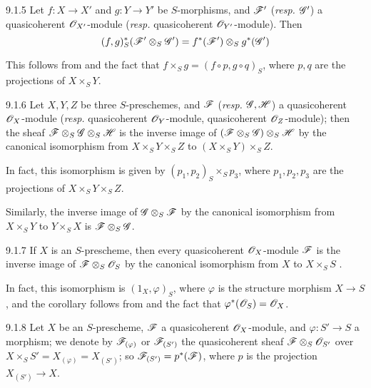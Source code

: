 \documentclass{book}
\begin{document}
\begin{envs}[Corollary]{9.1.5}
\label{cor-1.9.1.5}
Let $f\colon X\to X'$ and $g\colon Y\to Y'$ be
$S$-morphisms, and $\mathscr{F}'$ (\emph{resp.} $\mathscr{G}'$) a quasicoherent
$\mathscr{O}_{X'}$-module (\emph{resp.} quasicoherent $\mathscr{O}_{Y'}$-module). Then
\[
  (f,g)^\ast_S(\mathscr{F}'\otimes_S\mathscr{G}')
  =f^\ast(\mathscr{F}')\otimes_S g^\ast(\mathscr{G}')
\]
\end{envs}

This follows from  and the fact that $f\times_S g=(f\circ p, g\circ
q)_S$, where $p,q$ are the projections of $X\times_S Y$.

\begin{envs}[Corollary]{9.1.6}
\label{cor-1.9.1.6}
Let $X,Y,Z$ be three $S$-preschemes, and
$\mathscr{F}$ (\emph{resp.} $\mathscr{G},\mathscr{H}$) a quasicoherent $\mathscr{O}_X$-module
(\emph{resp.} quasicoherent $\mathscr{O}_Y$-module, quasicoherent $\mathscr{O}_Z$-module); then
the sheaf $\mathscr{F}\otimes_S\mathscr{G}\otimes_S\mathscr{H}$ is the inverse image
of $(\mathscr{F}\otimes_S\mathscr{G})\otimes_S\mathscr{H}$ by the canonical
isomorphism from $X\times_S Y\times_S Z$ to $(X\times_S Y)\times_S Z$.
\end{envs}

In fact, this isomorphism is given by $(p_1,p_2)_S\times_S p_3$, where
$p_1,p_2,p_3$ are the projections of $X\times_S Y\times_S Z$.

Similarly, the inverse image of $\mathscr{G}\otimes_S\mathscr{F}$ by the canonical
isomorphism from $X\times_S Y$ to $Y\times_S X$ is $\mathscr{F}\otimes_S\mathscr{G}$.

\begin{envs}[Corollary]{9.1.7}
\label{cor-1.9.1.7}
If $X$ is an $S$-prescheme, then every
quasicoherent $\mathscr{O}_X$-module $\mathscr{F}$ is the inverse image of
$\mathscr{F}\otimes_S\mathscr{O}_S$ by the canonical isomorphism from $X$ to $X\times_S S$
.
\end{envs}

In fact, this isomorphism is $(1_X,\varphi)_S$, where $\varphi$ is the structure
morphism $X\to S$, and the corollary follows from  and the fact that
$\varphi^\ast(\mathscr{O}_S)=\mathscr{O}_X$.

\begin{env}{9.1.8}
\label{env-1.9.1.8}
Let $X$ be an $S$-prescheme, $\mathscr{F}$ a quasicoherent
$\mathscr{O}_X$-module, and $\varphi\colon S'\to S$ a morphism; we denote by
$\mathscr{F}_{(\varphi)}$ or $\mathscr{F}_{(S')}$ the quasicoherent sheaf
$\mathscr{F}\otimes_S\mathscr{O}_{S'}$ over $X\times_S S'=X_{(\varphi)}=X_{(S')}$; so
$\mathscr{F}_{(S')}=p^\ast(\mathscr{F})$, where $p$ is the projection $X_{(S')}\to X$.
\end{env}
\end{document}
